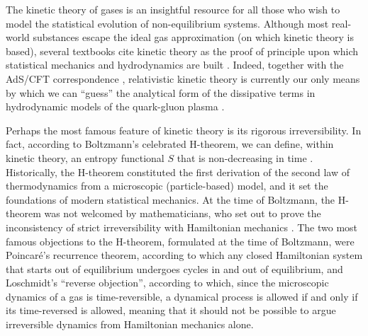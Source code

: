 \documentclass[aps,prd,preprint,nofootinbib,amsmath,amssymb,showpacs,longbibliography,singlecolumn,superscriptaddress,10pt]{revtex4-1}
\theoremstyle{plain}
\theoremstyle{definition}
\begin{document}
The kinetic theory of gases is an insightful resource for all those who wish to model the statistical evolution of non-equilibrium systems. Although most real-world substances escape the ideal gas approximation (on which kinetic theory is based), several textbooks cite kinetic theory as the proof of principle upon which statistical mechanics and hydrodynamics are built \cite{huang_book,rezzolla_book,Hakim2011}. Indeed, together with the AdS/CFT correspondence \cite{FlorkowskiReview2018,Romatschke2010}, relativistic kinetic theory is currently our only means by which we can ``guess'' the analytical form of the dissipative terms in hydrodynamic models of the quark-gluon plasma \cite{Rocha:2023hts,Rocha:2023ilf}.

Perhaps the most famous feature of kinetic theory is its rigorous irreversibility. In fact, according to Boltzmann's celebrated H-theorem, we can define, within kinetic theory, an entropy functional $S$ that is non-decreasing in time \cite{DeGroot:1980dk,cercignani:90mathematical}. Historically, the H-theorem constituted the first derivation of the second law of thermodynamics from a microscopic (particle-based) model, and it set the foundations of modern statistical mechanics. At the time of Boltzmann, the H-theorem was not welcomed by mathematicians, who set out to prove the inconsistency of strict irreversibility with Hamiltonian mechanics \cite{huang_book}. The two most famous objections to the H-theorem, formulated at the time of Boltzmann, were Poincar\'{e}'s recurrence theorem, according to which any closed Hamiltonian system that starts out of equilibrium undergoes cycles in and out of equilibrium, and Loschmidt's ``reverse objection'', according to which, since the microscopic dynamics of a gas is time-reversible, a dynamical process is allowed if and only if its time-reversed is allowed, meaning that it should not be possible to argue irreversible dynamics from Hamiltonian mechanics alone.
\end{document}
